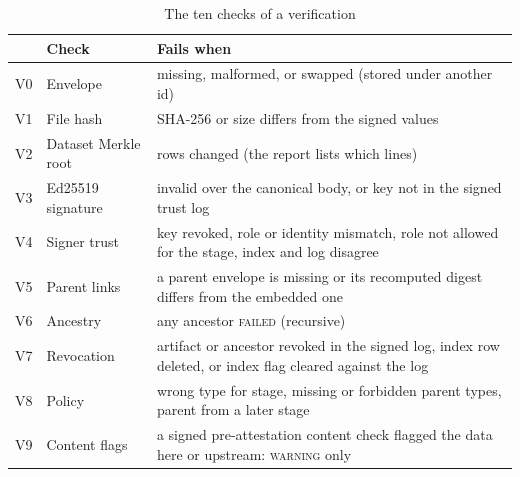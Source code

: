 \documentclass[conference]{IEEEtran}
\newcommand{\st}[1]{\textsc{#1}}
\begin{document}
\begin{table}[t]
\caption{The ten checks of a verification}
\label{tab:checks}
\centering
\scriptsize
\setlength{\tabcolsep}{3pt}
\begin{tabular}{@{}l>{\raggedright}p{2.05cm}>{\raggedright\arraybackslash}p{4.75cm}@{}}
\toprule
 & Check & Fails when \\
\midrule
V0 & Envelope & missing, malformed, or swapped (stored under another id) \\
V1 & File hash & SHA-256 or size differs from the signed values \\
V2 & Dataset Merkle root & rows changed (the report lists which lines) \\
V3 & Ed25519 signature & invalid over the canonical body, or key not in the signed trust log \\
V4 & Signer trust & key revoked, role or identity mismatch, role not allowed for the stage, index and log disagree \\
V5 & Parent links & a parent envelope is missing or its recomputed digest differs from the embedded one \\
V6 & Ancestry & any ancestor \st{failed} (recursive) \\
V7 & Revocation & artifact or ancestor revoked in the signed log, index row deleted, or index flag cleared against the log \\
V8 & Policy & wrong type for stage, missing or forbidden parent types, parent from a later stage \\
V9 & Content flags & a signed pre-attestation content check flagged the data here or upstream: \st{warning} only \\
\bottomrule
\end{tabular}
\end{table}
\end{document}
